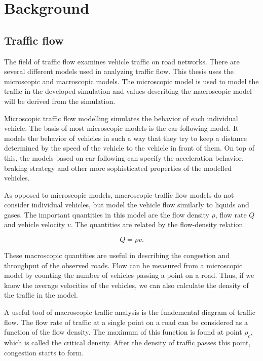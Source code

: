 \documentclass[english, 12pt, a4paper, elec, utf8, pdfa, online]{aaltothesis}
\begin{document}
\clearpage

\section{Background}

\subsection{Traffic flow}

The field of traffic flow examines vehicle traffic on road networks. There are several different models used in analyzing traffic flow. This thesis uses the microscopic and macroscopic models. The microscopic model is used to model the traffic in the developed simulation and values describing the macroscopic model will be derived from the simulation.

Microscopic traffic flow modelling simulates the behavior of each individual vehicle. The basis of most microscopic models is the car-following model. It models the behavior of vehicles in such a way that they try to keep a distance determined by the speed of the vehicle to the vehicle in front of them. On top of this, the models based on car-following can specify the acceleration behavior, braking strategy and other more sophisticated properties of the modelled vehicles.

As opposed to microscopic models, macroscopic traffic flow models do not consider individual vehicles, but model the vehicle flow similarly to liquids and gases. The important quantities in this model are the flow density $\rho$, flow rate $Q$ and vehicle velocity $v$. The quantities are related by the flow-density relation

\[ Q = \rho v .\]

These macroscopic quantities are useful in describing the congestion and throughput of the observed roads. Flow can be measured from a microscopic model by counting the number of vehicles passing a point on a road. Thus, if we know the average velocities of the vehicles, we can also calculate the density of the traffic in the model. \cite{treiber}

A useful tool of macroscopic traffic analysis is the fundemental diagram of traffic flow. The flow rate of traffic at a single point on a road can be considered as a function of the flow density. The maximum of this function is found at point $\rho_c$, which is called the critical density. After the density of traffic passes this point, congestion starts to form.\cite{kerner}
\end{document}
